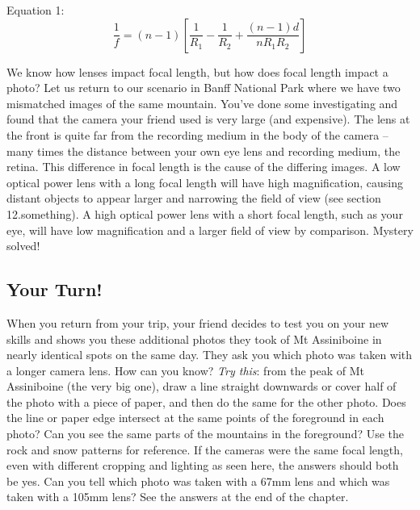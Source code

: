 \documentclass[
]{book}
\begin{document}
Equation 1: \[\frac{1}{f} = (n-1)[\frac{1}{R_1} - \frac{1}{R_2} + \frac{(n-1)d}{nR_1R_2}]\]

We know how lenses impact focal length, but how does focal length impact a photo? Let us return to our scenario in Banff National Park where we have two mismatched images of the same mountain. You've done some investigating and found that the camera your friend used is very large (and expensive). The lens at the front is quite far from the recording medium in the body of the camera -- many times the distance between your own eye lens and recording medium, the retina. This difference in focal length is the cause of the differing images. A low optical power lens with a long focal length will have high magnification, causing distant objects to appear larger and narrowing the field of view (see section 12.something). A high optical power lens with a short focal length, such as your eye, will have low magnification and a larger field of view by comparison. Mystery solved!

\hypertarget{your-turn-7}{%
\subsection*{Your Turn!}\label{your-turn-7}}

When you return from your trip, your friend decides to test you on your new skills and shows you these additional photos they took of Mt Assiniboine in nearly identical spots on the same day. They ask you which photo was taken with a longer camera lens. How can you know?
\emph{Try this}: from the peak of Mt Assiniboine (the very big one), draw a line straight downwards or cover half of the photo with a piece of paper, and then do the same for the other photo. Does the line or paper edge intersect at the same points of the foreground in each photo? Can you see the same parts of the mountains in the foreground? Use the rock and snow patterns for reference. If the cameras were the same focal length, even with different cropping and lighting as seen here, the answers should both be yes. Can you tell which photo was taken with a 67mm lens and which was taken with a 105mm lens? See the answers at the end of the chapter.
\end{document}
